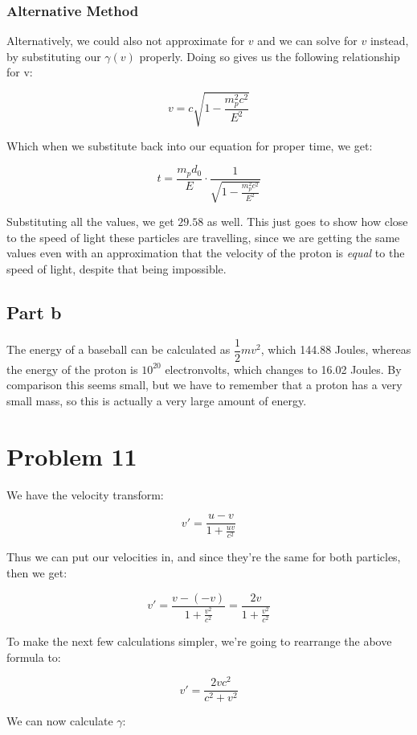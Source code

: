 \documentclass{article}
\theoremstyle{definition}
\numberwithin{equation}{section}
\numberwithin{definition}{section}
\begin{document}
	
	\subsubsection{Alternative Method}
	
	Alternatively, we could also not approximate for $v$ and we can solve for $v$ instead, by substituting our $\gamma(v)$ properly. Doing so gives us the following relationship for v:
	
	\[ v= c\sqrt{1 - \frac{m_p^2c^2}{E^2}}\]
	
	Which when we substitute back into our equation for proper time, we get:
	
	\[t = \frac{m_pd_0}{E} \cdot \frac{1}{\sqrt{1- \frac{m_p^2c^2}{E^2}}}\]
	
	Substituting all the values, we get $\boxed{29.58}$ as well. This just goes to show how close to the speed of light these particles are travelling, since we are getting the same values even with an approximation that the velocity of the proton is \textit{equal} to the speed of light, despite that being impossible.
	
	\subsection{Part b}
	
	The energy of a baseball can be calculated as $\dfrac{1}{2}mv^2$, which 144.88 Joules, whereas the energy of the proton is $10^{20}$ electronvolts, which changes to 16.02 Joules. By comparison this seems small, but we have to remember that a proton has a very small mass, so this is actually a very large amount of energy.
	
	\section{Problem 11}
	
	We have the velocity transform:
	
	\[v' = \frac{u-v}{1+ \frac{uv}{c^2}}\]
	
	Thus we can put our velocities in, and since they're the same for both particles, then we get:
	
	\[ v' = \frac{v - (-v)}{1 + \frac{v^2}{c^2}} = \frac{2v}{1 + \frac{v^2}{c^2}}\]
	
	To make the next few calculations simpler, we're going to rearrange the above formula to:
	
	\[ v' = \frac{2vc^2}{c^2 + v^2}\]
	
	We can now calculate $\gamma$:
	
\end{document}

